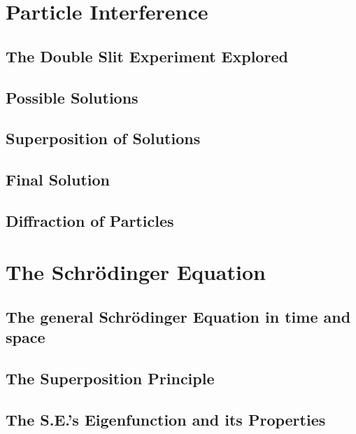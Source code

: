 \documentclass[colorlinks,11pt,a4paper,normalphoto,withhyper,ragged2e]{altareport}
\begin{document}
	
	\pagebreak
	
	
	
	
\section{Particle Interference}
	
	\subsection{The Double Slit Experiment Explored}
	
	
	\subsection{Possible Solutions}
	
	
	\subsection{Superposition of Solutions}
	
	
	\subsection{Final Solution}
	
	
	\subsection{Diffraction of Particles}
	
	
	\pagebreak
	
	
	
	
\section{The Schrödinger Equation}
	
	\subsection{The general Schrödinger Equation in time and space}
	
	
	\subsection{The Superposition Principle}
	
	
	\subsection{The S.E.’s Eigenfunction and its Properties}
	
\end{document}

